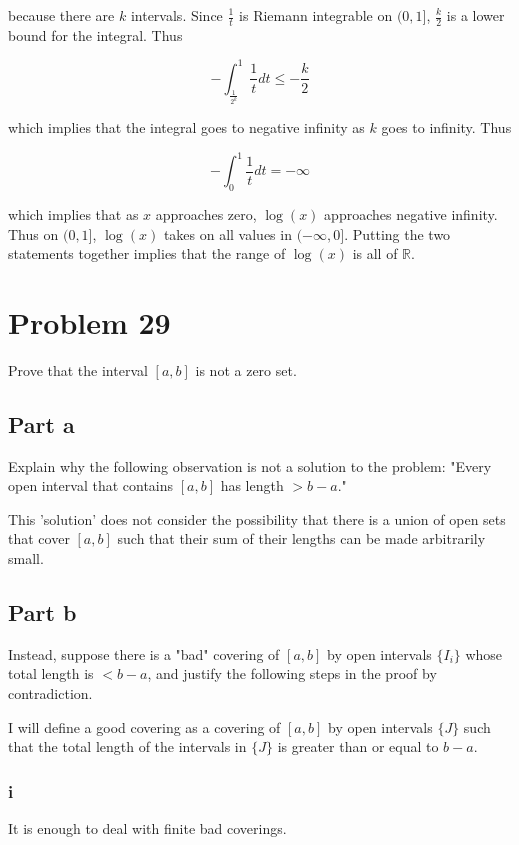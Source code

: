 \documentclass{article}
\newcommand{\R}{\mathbb{R}}
\begin{document}
because there are $k$ intervals. Since $\frac{1}{t}$ is Riemann integrable on $(0, 1]$, $\frac{k}{2}$ is a lower bound for the integral. Thus

\[
- \int_\frac{1}{2^k}^1 \frac{1}{t} dt \leq -\frac{k}{2}
\]

which implies that the integral goes to negative infinity as $k$ goes to infinity. Thus

\[
-\int_0^1 \frac{1}{t} dt = -\infty
\]

which implies that as $x$ approaches zero, $\log(x)$ approaches negative infinity. Thus on $(0, 1]$, $\log(x)$ takes on all values in $(-\infty, 0]$. Putting the two statements together implies that the range of $\log(x)$ is all of $\R$.

\section*{Problem 29}

Prove that the interval $[a, b]$ is not a zero set.

\subsection*{Part a}

Explain why the following observation is not a solution to the problem: "Every open interval that contains $[a, b]$ has length $> b-a$."

This 'solution' does not consider the possibility that there is a union of open sets that cover $[a, b]$ such that their sum of their lengths can be made arbitrarily small.

\subsection*{Part b}

Instead, suppose there is a "bad" covering of $[a, b]$ by open intervals $\{I_i\}$ whose total length is $< b-a$, and justify the following steps in the proof by contradiction.

I will define a good covering as a covering of $[a, b]$ by open intervals $\{J\}$ such that the total length of the intervals in $\{J\}$ is greater than or equal to $b-a$.

\subsubsection*{i}

It is enough to deal with finite bad coverings.
\end{document}
